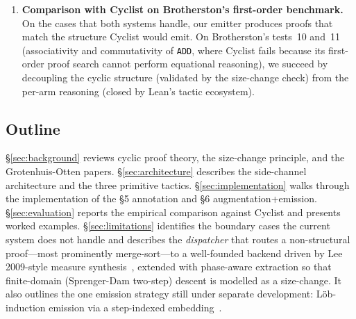 \begin{enumerate}
  \item \textbf{Comparison with Cyclist on Brotherston's first-order
    benchmark.} On the cases that both systems handle, our emitter produces
    proofs that match the structure Cyclist would emit. On
    Brotherston's tests~10 and~11 (associativity and commutativity of
    \texttt{ADD}, where Cyclist fails because its first-order proof search
    cannot perform equational reasoning), we succeed by decoupling the
    cyclic structure (validated by the size-change check) from the per-arm
    reasoning (closed by Lean's tactic ecosystem).
\end{enumerate}

\subsection{Outline}

§\ref{sec:background} reviews cyclic proof theory, the size-change principle,
and the Grotenhuis-Otten papers. §\ref{sec:architecture} describes the
side-channel architecture and the three primitive tactics.
§\ref{sec:implementation} walks through the implementation of the §5
annotation and §6 augmentation+emission. §\ref{sec:evaluation} reports the
empirical comparison against Cyclist and presents worked examples.
§\ref{sec:limitations} identifies the boundary cases the current system does
not handle and describes the \emph{dispatcher} that routes a non-structural
proof---most prominently merge-sort---to a well-founded backend driven by
Lee 2009-style measure synthesis~\cite{lee2009ranking}, extended with
phase-aware extraction so that finite-domain (Sprenger-Dam two-step) descent
is modelled as a size-change. It also outlines the one emission strategy still
under separate development: Löb-induction emission via a step-indexed
embedding~\cite{atkey2013productive}.
